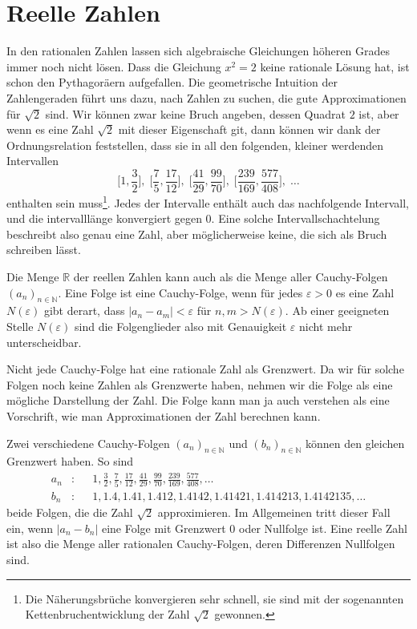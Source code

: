 %
%
%
\section{Reelle Zahlen
\label{buch:section:reelle-zahlen}}
In den rationalen Zahlen lassen sich algebraische Gleichungen höheren
Grades immer noch nicht lösen.
Dass die Gleichung $x^2=2$ keine rationale Lösung hat, ist schon den
Pythagoräern aufgefallen.
Die geometrische Intuition der Zahlengeraden führt uns dazu, nach
Zahlen zu suchen, die gute Approximationen für $\sqrt{2}$ sind.
Wir können zwar keine Bruch angeben, dessen Quadrat $2$ ist, aber 
wenn es eine Zahl $\sqrt{2}$ mit dieser Eigenschaft git, dann können
wir dank der Ordnungsrelation feststellen, dass sie in all den folgenden,
kleiner werdenden Intervallen
\[
\biggl[1,\frac32\biggr],\;
\biggl[\frac75,\frac{17}{12}\biggr],\;
\biggl[\frac{41}{29},\frac{99}{70}\biggr],\;
\biggl[\frac{239}{169},\frac{577}{408}\biggr],\;
\dots
\]
enthalten sein muss\footnote{Die Näherungsbrüche konvergieren sehr
schnell, sie sind mit der sogenannten Kettenbruchentwicklung der
Zahl $\sqrt{2}$ gewonnen.}.
Jedes der Intervalle enthält auch das nachfolgende Intervall, und
die intervalllänge konvergiert gegen 0.
Eine solche Intervallschachtelung beschreibt also genau eine Zahl,
aber möglicherweise keine, die sich als Bruch schreiben lässt.

Die Menge $\mathbb{R}$ der reellen Zahlen kann auch als die Menge 
aller Cauchy-Folgen $(a_n)_{n\in\mathbb{N}}$. 
Eine Folge ist eine Cauchy-Folge, wenn für jedes $\varepsilon>0$
es eine Zahl $N(\varepsilon)$ gibt derart, dass $|a_n-a_m|<\varepsilon$
für $n,m>N(\varepsilon)$.
Ab einer geeigneten Stelle $N(\varepsilon)$ sind die Folgenglieder also
mit Genauigkeit $\varepsilon$ nicht mehr unterscheidbar.

Nicht jede Cauchy-Folge hat eine rationale Zahl als Grenzwert.
Da wir für solche Folgen noch keine Zahlen als Grenzwerte haben,
nehmen wir die Folge als eine mögliche Darstellung der Zahl.
Die Folge kann man ja auch verstehen als eine Vorschrift, wie man
Approximationen der Zahl berechnen kann.

Zwei verschiedene Cauchy-Folgen $(a_n)_{n\in\mathbb{N}}$ und
$(b_n)_{n\in\mathbb{N}}$ 
können den gleichen Grenzwert haben.
So sind 
\[
\begin{aligned}
a_n&\colon&&
1,\frac32,\frac75,\frac{17}{12},\frac{41}{29},\frac{99}{70},\frac{239}{169},
\frac{577}{408},\dots
\\
b_n&\colon&&
1,1.4,1.41,1.412,1.4142,1.41421,1.414213,1.4142135,\dots
\end{aligned}
\]
beide Folgen, die die Zahl $\sqrt{2}$ approximieren.
Im Allgemeinen tritt dieser Fall ein, wenn $|a_n-b_n|$ eine
Folge mit Grenzwert $0$ oder Nullfolge ist.
Eine reelle Zahl ist also die Menge aller rationalen Cauchy-Folgen,
deren Differenzen Nullfolgen sind.

